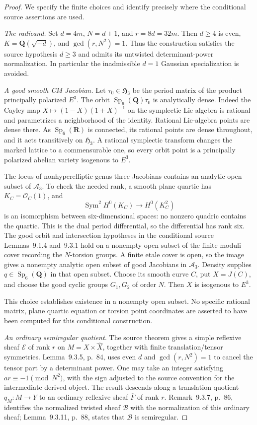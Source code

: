 \begin{proof}
We specify the finite choices and identify precisely where the
conditional source assertions are used.

\emph{The radicand.} Set $d=4m$, $N=d+1$, and $r=8d=32m$.
Then $d\ge4$ is even, $K=\mathbf Q(\sqrt{-d})$, and
$\gcd(r,N^2)=1$. Thus the construction satisfies the source
hypothesis $d\ge3$ and admits its untwisted determinant-power
normalization. In particular the inadmissible $d=1$ Gaussian
specialization is avoided.

\emph{A good smooth CM Jacobian.} Let $\tau_0\in\mathfrak H_3$
be the period matrix of the product principally polarized $E^3$.
The orbit $\operatorname{Sp}_6(\mathbf Q)\tau_0$ is analytically
dense. Indeed the Cayley map
$X\mapsto(1-X)(1+X)^{-1}$ on the symplectic Lie algebra is rational
and parametrizes a neighborhood of the identity. Rational
Lie-algebra points are dense there. As
$\operatorname{Sp}_6(\mathbf R)$ is connected, its rational points
are dense throughout, and it acts transitively on $\mathfrak H_3$.
A rational symplectic transform changes the marked lattice to a
commensurable one, so every orbit point is a principally polarized
abelian variety isogenous to $E^3$.

The locus of nonhyperelliptic genus-three Jacobians contains an
analytic open subset of $\mathcal A_3$. To check the needed rank,
a smooth plane quartic has $K_C=\mathcal O_C(1)$, and
\[
 \operatorname{Sym}^2H^0(K_C)\longrightarrow H^0(K_C^2)
\]
is an isomorphism between six-dimensional spaces: no nonzero
quadric contains the quartic. This is the dual period differential,
so the differential has rank six. The good orbit and intersection
hypotheses in the conditional source Lemmas~9.1.4 and~9.3.1 hold
on a nonempty open subset of the finite moduli cover recording the
$N$-torsion groups. A finite etale cover is open, so the image gives
a nonempty analytic open subset of good Jacobians in $\mathcal A_3$.
Density supplies $q\in\operatorname{Sp}_6(\mathbf Q)$ in that
open subset. Choose its smooth curve $C$, put $X=J(C)$, and choose
the good cyclic groups $G_1,G_2$ of order $N$. Then $X$ is isogenous
to $E^3$.

This choice establishes existence in a nonempty open subset. No
specific rational matrix, plane quartic equation or torsion point
coordinates are asserted to have been computed for this conditional
construction.

\emph{An ordinary semiregular quotient.} The source theorem gives
a simple reflexive sheaf $\mathcal E$ of rank $r$ on
$M=X\times\widehat X$, together with finite translation/tensor
symmetries. Lemma~9.3.5, p.~84, uses even $d$ and
$\gcd(r,N^2)=1$ to cancel the tensor part by a determinant power.
One may take an integer satisfying $ar\equiv-1\pmod{N^2}$,
with the sign adjusted to the source convention for the intermediate
derived object. The result descends along a translation quotient
$q_M:M\to Y$ to an ordinary reflexive sheaf $\overline F$ of
rank $r$. Remark~9.3.7, p.~86, identifies the normalized twisted
sheaf $\mathcal B$ with the normalization of this ordinary sheaf;
Lemma~9.3.11, p.~88, states that $\mathcal B$ is semiregular.


\end{proof}
